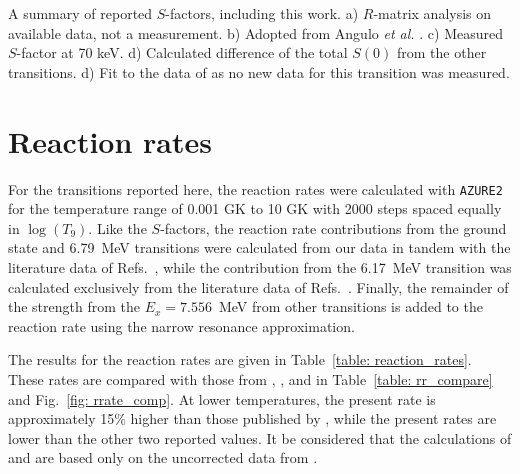 \begin{table}
\begin{threeparttable}
\begin{tablenotes}
\small 
\item A summary of reported $S$-factors, including this work. a) $R$-matrix analysis on available data, not a measurement. b) Adopted from Angulo \textit{et al.} \cite{Angulo2001}. c) Measured $S$-factor at 70 keV. d) Calculated difference of the total $S(0)$ from the other transitions. d) Fit to the data of \cite{Schroder1987, Runkle2005, Imbriani2005} as no new data for this transition was measured.
\end{tablenotes}
\end{threeparttable}
\label{table: new_s_factors}
\end{table}




\section{Reaction rates}
\label{sec: reaction rates}


For the transitions reported here, the reaction rates were calculated with \texttt{AZURE2} for the temperature range of 0.001 GK to 10 GK with 2000 steps spaced equally in $\log(T_{9})$. Like the $S$-factors, the reaction rate contributions from the ground state and 6.79~MeV transitions were calculated from our data in tandem with the literature data of Refs.~\cite{Formicola2004, Imbriani2005, Marta2008, Marta2011, Runkle2005, Schroder1987, Li2016, Wagner2018}, while the contribution from the 6.17~MeV transition was calculated exclusively from the literature data of Refs.~\cite{Runkle2005, Imbriani2005, Schroder1987}. Finally, the remainder of the strength from the $E_{x}= 7.556$~MeV from other transitions is added to the reaction rate using the narrow resonance approximation.

The results for the reaction rates are given in Table~\ref{table: reaction_rates}. These rates are compared with those from \citet{Caughlan1988}, \citet{Angulo1999}, and \citet{Imbriani2005} in Table~\ref{table: rr_compare} and Fig.~\ref{fig: rrate_comp}. At lower temperatures, the present rate is approximately 15$\%$ higher than those published by \citet{Imbriani2005}, while the present rates are lower than the other two reported values. It be considered that the calculations of \citet{Caughlan1988} and \citet{Angulo1999} are based only on the uncorrected data from \citet{Schroder1987}. 


